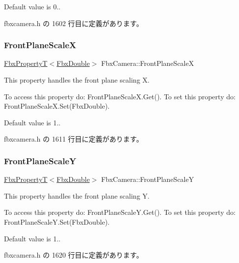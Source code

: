 Default value is 0.. 

 fbxcamera.\+h の 1602 行目に定義があります。

\mbox{\label{class_fbx_camera_a13396eaf60196ca60b78e3c05ee74021}} 
\subsubsection{\texorpdfstring{Front\+Plane\+ScaleX}{FrontPlaneScaleX}}
{\footnotesize\ttfamily \hyperlink{class_fbx_property_t}{Fbx\+PropertyT}$<$\hyperlink{fbxtypes_8h_a171e72a1c46fc15c1a6c9c31948c1c5b}{Fbx\+Double}$>$ Fbx\+Camera\+::\+Front\+Plane\+ScaleX}

This property handles the front plane scaling X.

To access this property do\+: Front\+Plane\+Scale\+X.\+Get(). To set this property do\+: Front\+Plane\+Scale\+X.\+Set(\+Fbx\+Double).

Default value is 1.. 

 fbxcamera.\+h の 1611 行目に定義があります。

\mbox{\label{class_fbx_camera_a48072957694967921a9b9eccfadc6dce}} 
\subsubsection{\texorpdfstring{Front\+Plane\+ScaleY}{FrontPlaneScaleY}}
{\footnotesize\ttfamily \hyperlink{class_fbx_property_t}{Fbx\+PropertyT}$<$\hyperlink{fbxtypes_8h_a171e72a1c46fc15c1a6c9c31948c1c5b}{Fbx\+Double}$>$ Fbx\+Camera\+::\+Front\+Plane\+ScaleY}

This property handles the front plane scaling Y.

To access this property do\+: Front\+Plane\+Scale\+Y.\+Get(). To set this property do\+: Front\+Plane\+Scale\+Y.\+Set(\+Fbx\+Double).

Default value is 1.. 

 fbxcamera.\+h の 1620 行目に定義があります。

\mbox{\label{class_fbx_camera_ae7a43caba31795438a1ca41926a8e31c}} 

